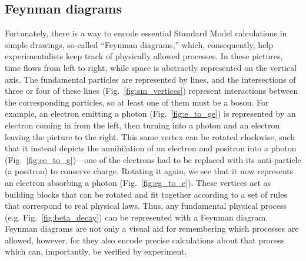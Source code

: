 \subsection{Feynman diagrams}
Fortunately, there is a way to encode essential Standard Model calculations in simple drawings, so-called ``Feynman diagrams,'' which, consequently, help experimentalists keep track of physically allowed processes. 
In these pictures, time flows from left to right, while space is abstractly represented on the vertical axis\footnotemark{}. 
The fundamental particles are represented by lines, and the intersections of three or four of these lines (Fig.~\ref{fig:sm_vertices}) represent interactions between the corresponding particles, so at least one of them must be a boson. 
For example, an electron emitting a photon (Fig.~\ref{fig:e_to_ge}) is represented by an electron coming in from the left, then turning into a photon and an electron leaving the picture to the right. 
This same vertex can be rotated clockwise, such that it instead depicts the annihilation of an electron and positron into a photon (Fig.~\ref{fig:ee_to_g})---one of the electrons had to be replaced with its anti-particle (a positron) to conserve charge. 
Rotating it again, we see that it now represents an electron absorbing a photon (Fig.~\ref{fig:eg_to_e}). 
These vertices act as building blocks that can be rotated and fit together according to a set of rules that correspond to real physical laws. 
Thus, any fundamental physical process (e.g. Fig.~\ref{fig:beta_decay}) can be represented with a Feynman diagram. 
Feynman diagrams are not only a visual aid for remembering which processes are allowed, however, for they also encode precise calculations about that process which can, importantly, be verified by experiment.

